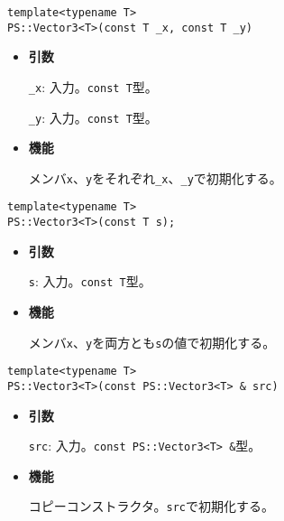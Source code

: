 \begin{screen}
\begin{verbatim}
template<typename T>
PS::Vector3<T>(const T _x, const T _y)
\end{verbatim}
\end{screen}

\begin{itemize}

\item{{\bf 引数}}

{\tt \_x}: 入力。{\tt const T}型。

{\tt \_y}: 入力。{\tt const T}型。

\item{{\bf 機能}}

メンバ{\tt x}、{\tt y}をそれぞれ{\tt \_x}、{\tt \_y}で初期化する。

\end{itemize}

\begin{screen}
\begin{verbatim}
template<typename T>
PS::Vector3<T>(const T s);
\end{verbatim}
\end{screen}

\begin{itemize}

\item{{\bf 引数}}

{\tt s}: 入力。{\tt const T}型。

\item{{\bf 機能}}

メンバ{\tt x}、{\tt y}を両方とも{\tt s}の値で初期化する。

\end{itemize}

\begin{screen}
\begin{verbatim}
template<typename T>
PS::Vector3<T>(const PS::Vector3<T> & src)
\end{verbatim}
\end{screen}

\begin{itemize}

\item{{\bf 引数}}

{\tt src}: 入力。{\tt const PS::Vector3<T> \&}型。

\item{{\bf 機能}}

コピーコンストラクタ。{\tt src}で初期化する。

\end{itemize}

